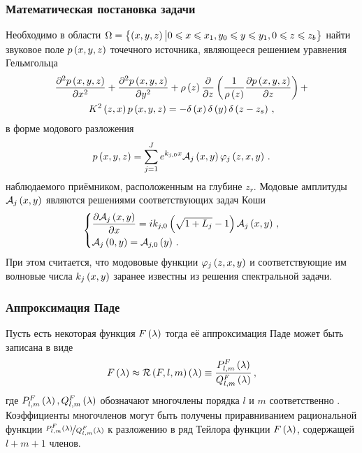 \documentclass[../document.tex]{subfiles}
\begin{document}
        \subsubsection{Математическая постановка задачи}
            \par Необходимо в области $\Omega=\left\{\left(x,y,z\right)\big|0\leqslant x\leqslant x_1,y_0\leqslant y\leqslant y_1,0\leqslant z\leqslant z_b\right\}$ найти звуковое поле $p\left(x,y,z\right)$ точечного источника, являющееся решением уравнения Гельмгольца
            \begin{multline}
                \frac{\partial^2p\left(x,y,z\right)}{\partial x^2}+\frac{\partial^2p\left(x,y,z\right)}{\partial y^2}+\rho\left(z\right)\frac{\partial}{\partial z}\left(\frac{1}{\rho\left(z\right)}\frac{\partial p\left(x,y,z\right)}{\partial z}\right)+\\
                K^2\left(z,x\right)p\left(x,y,z\right)=-\delta\left(x\right)\delta\left(y\right)\delta\left(z-z_s\right)\,,
            \end{multline}
            в форме модового разложения
            \begin{equation}
                p\left(x,y,z\right)=\sum\limits_{j=1}^Je^{k_{j,0}x}\mathcal{A}_j\left(x,y\right)\varphi_j\left(z,x,y\right)\,.
            \end{equation}
            наблюдаемого приёмником, расположенным на глубине $z_r$. Модовые амплитуды $\mathcal{A}_j\left(x,y\right)$ являются решениями соответствующих задач Коши
            \begin{equation}\label{eq::WAMPE_problem}
                \begin{dcases}
                    \frac{\partial\mathcal{A}_j\left(x,y\right)}{\partial x}=ik_{j,0}\left(\sqrt{1+L_j}-1\right)\mathcal{A}_j\left(x,y\right)\,,\\
                    \mathcal{A}_j\left(0,y\right)=\mathcal{A}_{j,0}\left(y\right)\,.
                \end{dcases}
            \end{equation}
            При этом считается, что модововые функции $\varphi_j\left(z,x,y\right)$ и соответствующие им волновые числа $k_j\left(x,y\right)$ заранее известны из решения спектральной задачи.
        \subsubsection{Аппроксимация Паде}
            \par Пусть есть некоторая функция $F\left(\lambda\right)$ тогда её аппроксимация Паде может быть записана в виде
            \begin{equation}
                F\left(\lambda\right)\approx\mathcal{R}\left(F,l,m\right)\left(\lambda\right)\equiv\frac{P_{l,m}^F\left(\lambda\right)}{Q_{l,m}^F\left(\lambda\right)}\,,
            \end{equation}
            где $P_{l,m}^F\left(\lambda\right),Q_{l,m}^F\left(\lambda\right)$ обозначают многочлены порядка $l$ и $m$ соответственно \cite{jensen}. Коэффициенты многочленов могут быть получены приравниванием рациональной функции $\nicefrac{P_{l,m}^F\left(\lambda\right)}{Q_{l,m}^F\left(\lambda\right)}$ к разложению в ряд Тейлора функции $F\left(\lambda\right)$, содержащей $l+m+1$ членов.
\end{document}
